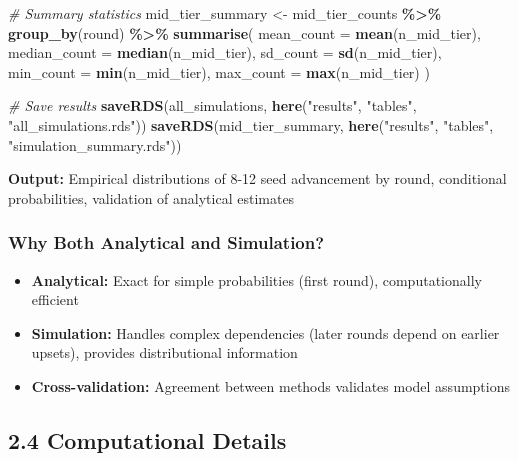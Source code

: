 \documentclass[
]{article}
\newenvironment{Shaded}{\begin{snugshade}}{\end{snugshade}}
\newcommand{\AttributeTok}[1]{\textcolor[rgb]{0.13,0.29,0.53}{#1}}
\newcommand{\CommentTok}[1]{\textcolor[rgb]{0.56,0.35,0.01}{\textit{#1}}}
\newcommand{\FunctionTok}[1]{\textcolor[rgb]{0.13,0.29,0.53}{\textbf{#1}}}
\newcommand{\NormalTok}[1]{#1}
\newcommand{\OtherTok}[1]{\textcolor[rgb]{0.56,0.35,0.01}{#1}}
\newcommand{\SpecialCharTok}[1]{\textcolor[rgb]{0.81,0.36,0.00}{\textbf{#1}}}
\newcommand{\StringTok}[1]{\textcolor[rgb]{0.31,0.60,0.02}{#1}}
\providecommand{\tightlist}{%
  \setlength{\itemsep}{0pt}\setlength{\parskip}{0pt}}
\begin{document}
\begin{Shaded}
\begin{Highlighting}[]
\CommentTok{\# Summary statistics}
\NormalTok{mid\_tier\_summary }\OtherTok{\textless{}{-}}\NormalTok{ mid\_tier\_counts }\SpecialCharTok{\%\textgreater{}\%}
    \FunctionTok{group\_by}\NormalTok{(round) }\SpecialCharTok{\%\textgreater{}\%}
    \FunctionTok{summarise}\NormalTok{(}
        \AttributeTok{mean\_count =} \FunctionTok{mean}\NormalTok{(n\_mid\_tier),}
        \AttributeTok{median\_count =} \FunctionTok{median}\NormalTok{(n\_mid\_tier),}
        \AttributeTok{sd\_count =} \FunctionTok{sd}\NormalTok{(n\_mid\_tier),}
        \AttributeTok{min\_count =} \FunctionTok{min}\NormalTok{(n\_mid\_tier),}
        \AttributeTok{max\_count =} \FunctionTok{max}\NormalTok{(n\_mid\_tier)}
\NormalTok{    )}

\CommentTok{\# Save results}
\FunctionTok{saveRDS}\NormalTok{(all\_simulations, }\FunctionTok{here}\NormalTok{(}\StringTok{"results"}\NormalTok{, }\StringTok{"tables"}\NormalTok{, }\StringTok{"all\_simulations.rds"}\NormalTok{))}
\FunctionTok{saveRDS}\NormalTok{(mid\_tier\_summary, }\FunctionTok{here}\NormalTok{(}\StringTok{"results"}\NormalTok{, }\StringTok{"tables"}\NormalTok{, }\StringTok{"simulation\_summary.rds"}\NormalTok{))}
\end{Highlighting}
\end{Shaded}

\textbf{Output:} Empirical distributions of 8-12 seed advancement by
round, conditional probabilities, validation of analytical estimates

\subsubsection{Why Both Analytical and
Simulation?}\label{why-both-analytical-and-simulation}

\begin{itemize}
\tightlist
\item
  \textbf{Analytical:} Exact for simple probabilities (first round),
  computationally efficient
\item
  \textbf{Simulation:} Handles complex dependencies (later rounds depend
  on earlier upsets), provides distributional information
\item
  \textbf{Cross-validation:} Agreement between methods validates model
  assumptions
\end{itemize}

\subsection{2.4 Computational Details}\label{computational-details}
\end{document}
